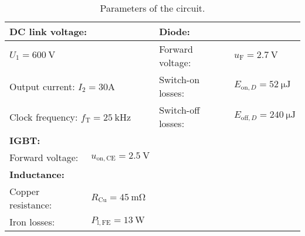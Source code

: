    
      \begin{table}[h]
        \centering  %
                \begin{tabular}{|l|l|l|l|}
            \hline
            \multicolumn{2}{|l|}{\textbf{DC link voltage:}} & \multicolumn{2}{l|}{\textbf{Diode:}} \\
            \hline
            \multicolumn{2}{|l|}{$U_{\mathrm{1}} = \SI{600}{\volt}$} & Forward voltage: & $u_{\mathrm{F}} = \SI{2.7}{\volt}$ \\
            \hline
            \multicolumn{2}{|l|}{Output current: $I_2 = 30$A} & Switch-on losses: & $E_{\text{on},D} = \SI{52}{\micro\joule}$ \\
            \hline
            \multicolumn{2}{|l|}{Clock frequency: $f_{\mathrm{T}} = \SI{25}{\kilo\hertz}$} & Switch-off losses: & $E_{\text{off},D} = \SI{240}{\micro\joule}$ \\
            \hline
            \multicolumn{2}{|l|}{\textbf{IGBT:}} & \multicolumn{2}{l|}{} \\
            \hline
            Forward voltage: & $u_{\mathrm{on},\mathrm{CE}} = \SI{2.5}{\volt}$ & \multicolumn{2}{l|}{} \\
            \hline
            \multicolumn{2}{|l|}{\textbf{Inductance:}} & \multicolumn{2}{l|}{} \\
            \hline
            Copper resistance: & $R_{\text{Cu}} = \SI{45}{\milli\ohm}$ & \multicolumn{2}{l|}{} \\
            \hline
            Iron losses: & $P_{\mathrm{l},\text{FE}} = \SI{13}{\watt}$ & \multicolumn{2}{l|}{} \\
            \hline
        \end{tabular}
        \caption{Parameters of the circuit.}  %
        \label{table:Parameters of the circuit}
    \end{table}

